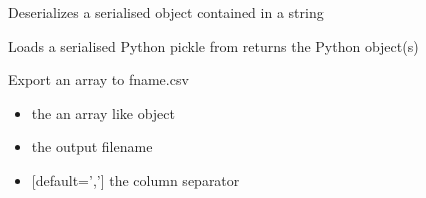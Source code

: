 \documentclass[letterpaper,10pt,english]{sphinxmanual}
\begin{document}
\begin{fulllineitems}
\label{\detokenize{modules_doc:cbmpy.CBTools.deSerialize}}
\pysigstartsignatures
{}
\pysigstopsignatures
\sphinxAtStartPar
Deserializes a serialised object contained in a string

\end{fulllineitems}


\begin{fulllineitems}
\label{\detokenize{modules_doc:cbmpy.CBTools.deSerializeFromDisk}}
\pysigstartsignatures
{}
\pysigstopsignatures
\sphinxAtStartPar
Loads a serialised Python pickle from  returns the Python object(s)

\end{fulllineitems}


\begin{fulllineitems}
\label{\detokenize{modules_doc:cbmpy.CBTools.exportArray2CSV}}
\pysigstartsignatures
{}
\pysigstopsignatures
\sphinxAtStartPar
Export an array to fname.csv
\begin{itemize}
\item {} 
\sphinxAtStartPar
{} the an array like object

\item {} 
\sphinxAtStartPar
{} the output filename

\item {} 
\sphinxAtStartPar
{} {[}default=’,’{]} the column separator

\end{itemize}

\end{fulllineitems}

\end{document}
